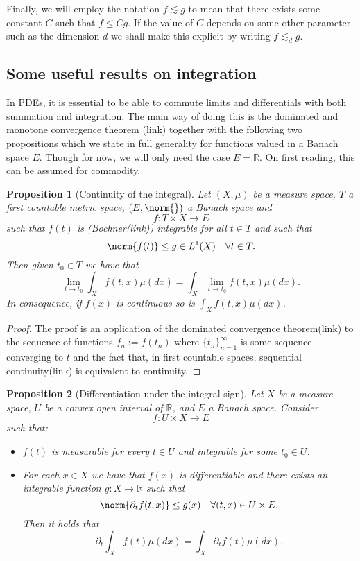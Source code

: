 \documentclass[
]{article}
\begin{document}
Finally, we will employ the notation \(f\lesssim g\) to mean that there
exists some constant \(C\) such that \(f\leq Cg\). If the value of \(C\)
depends on some other parameter such as the dimension \(d\) we shall
make this explicit by writing \(f\lesssim_d g\).

\hypertarget{some-useful-results-on-integration}{%
	\subsection*{Some useful results on
		integration}\label{some-useful-results-on-integration}}

In PDEs, it is essential to be able to commute limits and differentials
with both summation and integration. The main way of doing this is the
dominated and monotone convergence theorem (link) together with the
following two propositions which we state in full generality for
functions valued in a Banach space \(E\). Though for now, we will only
need the case \(E={\mathbb R}\). On first reading, this can be assumed
for commodity.

\leavevmode{}%
\textbf{Proposition 1} (Continuity of the integral). \emph{Let
	\((X,\mu )\) be a measure space, \(T\) a first countable metric space,
	\((E,\norm{})\) a Banach space and \[f:T\times X\to E\] such that
	\(f(t)\) is (Bochner(link)) integrable for all \({t}\in{T}\) and such
	that \[\norm{f(t)}\leq g\in L^1(X)\quad \forall{t}\in {T}.\] Then given
	\(t_0\in T\) we have that
	\[\lim_{t\to t_0}\int_X f(t,x)\mu(dx) =\int_X\lim_{t\to t_0}f(t,x)\mu(dx) .\]
	In consequence, if \(f(x)\) is continuous so is
	\(\int_X f(t,x) \mu(dx)\).}

\emph{Proof.} The proof is an application of the dominated convergence
theorem(link) to the sequence of functions \(f_n:=f(t_n)\) where
\(\{t_n\}_{n=1}^\infty\) is some sequence converging to \(t\) and the
fact that, in first countable spaces, sequential continuity(link) is
equivalent to continuity.~◻

\leavevmode{}%
\textbf{Proposition 2} ({Differentiation under the integral sign}).
\emph{Let \(X\) be a measure space, \(U\) be a convex open interval of
	\({\mathbb R}\), and \(E\) a Banach space. Consider \[f:U\times X\to E\]
	such that:}

\begin{itemize}
	\item
	      \emph{\(f(t)\) is measurable for every \(t\in U\) and integrable for
		      some \(t_0\in U\).}
	\item
	      \emph{For each \(x\in X\) we have that \(f(x)\) is differentiable and
		      there exists an integrable function \(g: X\to{\mathbb R}\) such that
		      \[\norm{\partial_{t}{f}(t,x)}\leq g(x)\quad \forall{(t,x)}\in {U\times E}.\]
		      Then it holds that
		      \[\partial_{t}{\int_X f(t)\mu(dx)}=\int_X \partial_{t}f(t) \mu(dx).\]}
\end{itemize}
\end{document}
